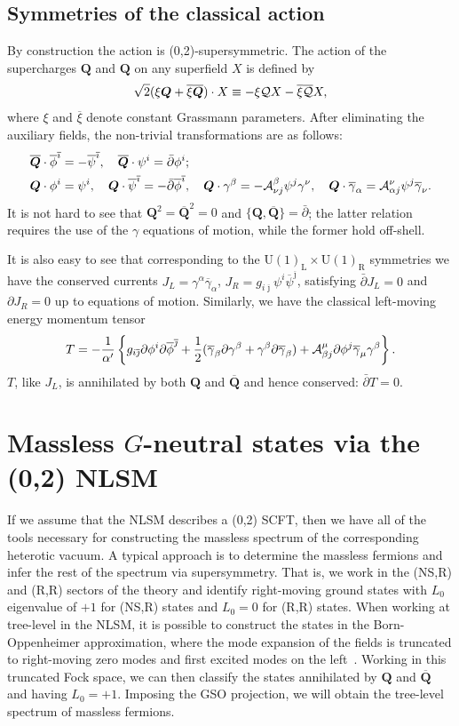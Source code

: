 \documentclass[11pt, a4paper]{article}
\def\AC#1#2{{\{#1,#2\}}}
\def\cQb{{\overline{\cQ}}}
\def\GUL{\GU(1)_{\text{L}}}
\def\GUR{\GU(1)_{\text{R}}}
\def\GU{\operatorname{U{}}}
\def\p{\partial}
\def\pb{\bar{\partial}}
\def\cA{{\cal A}}
\def\cQ{{\cal Q}}
\newcommand\gammab{\overline{\gamma}}
\newcommand\xib{\overline{\xi}}
\newcommand\phib{\overline{\phi}}
\newcommand\psib{\overline{\psi}}
\newcommand\ib{\overline{\imath}}
\newcommand\jb{\overline{\jmath}}
\def\cQb{\overline{\cQ}}
\def\bQ{{{\boldsymbol{Q}}}}
\def\bQb{{{\overline{\bQ}}}}
\begin{document}
\subsection{Symmetries of the classical action}
By construction the action is (0,2)-supersymmetric.  The action of the 
supercharges $\bQ$ and $\bQ$ on any superfield $X$ is defined by
\begin{align*}
 \sqrt{2} (\xi \bQ + \xib \bQb) \cdot X \equiv -\xi \cQ X -\xib \cQb X,
\end{align*}
where $\xi$ and $\xib$ denote constant Grassmann parameters. After
eliminating the auxiliary fields, the non-trivial transformations are as
follows:
\begin{align*}
\bQb \cdot \phib^{\ib}  &=-\psib^{\ib},  \quad 
\bQb \cdot \psi^i =\pb \phi^i;  \nonumber\\
\bQ \cdot \phi^i & = \psi^i, \quad
\bQ \cdot \psib^{\ib}  = -\pb\phib^{\ib}, \quad
\bQ \cdot \gamma^\beta  = -\cA^\beta_{\nu j} \psi^j\gamma^\nu, \quad
\bQ \cdot \gammab_{\alpha}  =  \cA^\nu_{\alpha j} \psi^j \gammab_\nu. 
\end{align*}
It is not hard to see that $\bQ^2 =\bQb^2 = 0$ and $\AC{\bQ}{\bQb} = \pb$;
the latter relation requires the use of the $\gamma$ equations of motion, while the former
hold off-shell.

It is also easy to see that corresponding to the $\GUL\times\GUR$ symmetries
we have the conserved currents $J_L = \gamma^\alpha\gammab_\alpha$, 
$J_R = g_{i\jb} \psi^i\psib^{\jb}$, satisfying $\pb J_L =0$ and $\p J_R =0$
up to equations of motion.  Similarly, we have the classical left-moving energy
momentum tensor
\begin{align}
\label{eq:classT}
T = -\frac{1}{\alpha'} \left\{g_{i\jb} \p\phi^i\p\phib^{\jb} 
+\frac{1}{2} (\gammab_\beta \p\gamma^\beta+\gamma^\beta\p\gammab_\beta)
+\cA^\mu_{\beta j} \p\phi^j \gammab_\mu\gamma^\beta\right\}.
\end{align}
$T$, like $J_L$, is annihilated by both $\bQ$ and $\bQb$ and hence conserved:
$\pb T = 0$.

\section{Massless $G$-neutral states via the (0,2) NLSM}\label{s:def}
If we assume that the NLSM describes a (0,2) SCFT, then we have all of the
tools necessary for constructing the massless spectrum of the corresponding
heterotic vacuum.  A typical approach is to determine the massless
fermions and infer the rest of the spectrum via  supersymmetry.  That is,
we work in the (NS,R) and (R,R) sectors of the theory and identify right-moving
ground states with $L_0$ eigenvalue of $+1$ for (NS,R) states and $L_0 = 0$ for
(R,R) states.  When working at tree-level
in the NLSM, it is possible to construct the states in the Born-Oppenheimer
approximation, where the mode expansion of the fields is truncated to right-moving
zero modes and first excited modes on the left~\cite{Rohm:1985jv}.  Working in this truncated
Fock space, we can then classify the states annihilated by $\bQ$ and $\bQb$
and having $L_0 =+1$.  Imposing the GSO projection, we will obtain the
tree-level spectrum of massless fermions.
\end{document}
